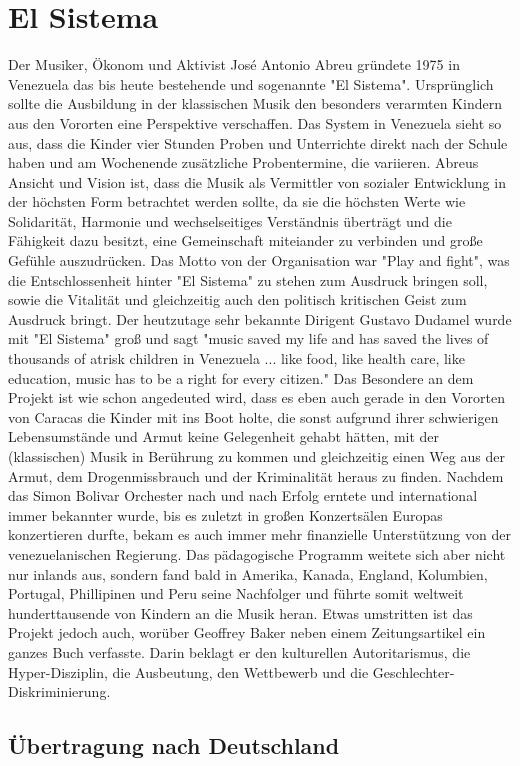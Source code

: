 \section{El Sistema}

Der Musiker, Ökonom und Aktivist José Antonio Abreu gründete 1975 in Venezuela
das bis heute bestehende und sogenannte "El Sistema". 
Ursprünglich sollte die Ausbildung in der klassischen Musik den besonders verarmten Kindern aus den Vororten
eine Perspektive verschaffen. Das System in Venezuela sieht so aus, dass die
Kinder vier Stunden Proben und Unterrichte direkt nach der Schule haben und am
Wochenende zusätzliche Probentermine, die variieren. Abreus Ansicht und Vision ist, dass die
Musik als Vermittler von sozialer Entwicklung in der höchsten Form betrachtet
werden sollte, da sie die höchsten Werte wie Solidarität, Harmonie und
wechselseitiges Verständnis überträgt und die Fähigkeit dazu besitzt, eine
Gemeinschaft miteiander zu verbinden und große Gefühle auszudrücken. Das Motto
von der Organisation war "Play and fight", was die Entschlossenheit hinter "El
Sistema" zu stehen zum Ausdruck bringen soll, sowie die Vitalität und
gleichzeitig auch den politisch kritischen Geist zum Ausdruck bringt. Der
heutzutage sehr bekannte Dirigent Gustavo Dudamel wurde mit "El Sistema" groß
und sagt "music saved my life and has saved the lives of thousands of atrisk
children in Venezuela ... like food, like health care, like education, music has
to be a right for every citizen."%
Das Besondere an dem Projekt ist wie schon angedeuted wird, dass es eben auch
gerade in den Vororten von Caracas die Kinder mit ins Boot holte, die sonst
aufgrund ihrer schwierigen Lebensumstände und Armut keine Gelegenheit gehabt
hätten, mit der (klassischen) Musik in Berührung zu kommen und gleichzeitig
einen Weg aus der Armut, dem Drogenmissbrauch und der Kriminalität heraus zu
finden. Nachdem das Simon Bolivar Orchester nach und nach Erfolg erntete und international
immer bekannter wurde, bis es zuletzt in großen Konzertsälen Europas
konzertieren durfte, bekam es auch immer mehr finanzielle Unterstützung von der
venezuelanischen Regierung. Das pädagogische Programm weitete sich aber nicht
nur inlands aus, sondern fand bald in Amerika, Kanada, England, Kolumbien,
Portugal, Phillipinen und Peru seine Nachfolger und führte somit weltweit
hunderttausende von Kindern an die Musik heran. Etwas umstritten ist das Projekt
jedoch auch, worüber Geoffrey Baker neben einem Zeitungsartikel ein ganzes
Buch verfasste. Darin beklagt er den kulturellen Autoritarismus, die
Hyper-Disziplin, die Ausbeutung, den Wettbewerb und die
Geschlechter-Diskriminierung. 


\subsection{Übertragung nach Deutschland}

